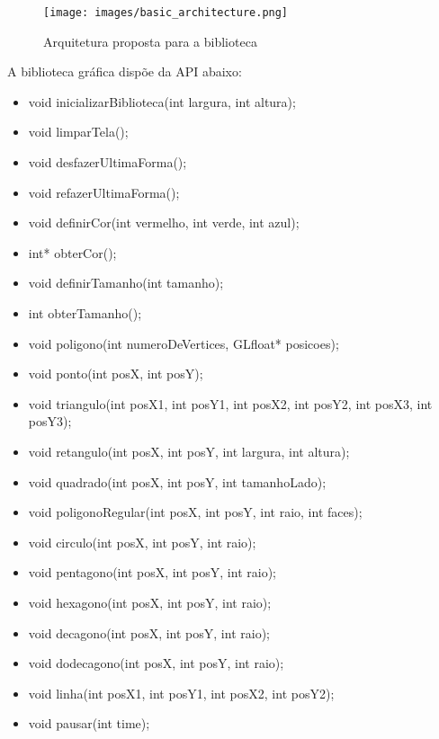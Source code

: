 \documentclass[12pt, %
openright,
oneside, %
a4paper,    %
brazil]{facom-ufu-abntex2}
\begin{document}
\begin{figure}[htbp]
  \centering
  \texttt{[image: images/basic\_architecture.png]}
  \caption{Arquitetura proposta para a biblioteca}
  \label{fig:arquitetura_proposta}
\end{figure}

A biblioteca gráfica dispõe da API abaixo:

\begin{itemize}
    \item void inicializarBiblioteca(int largura, int altura);
    \item void limparTela();
    
    \item void desfazerUltimaForma();
    \item void refazerUltimaForma();
    
    \item void definirCor(int vermelho, int verde, int azul);
    \item int* obterCor();
    
    \item void definirTamanho(int tamanho);
    \item int obterTamanho();

    \item void poligono(int numeroDeVertices, GLfloat* posicoes);
    \item void ponto(int posX, int posY);
    \item void triangulo(int posX1, int posY1, int posX2, int posY2, int posX3, int posY3);
    \item void retangulo(int posX, int posY, int largura, int altura);
    \item void quadrado(int posX, int posY, int tamanhoLado);
    \item void poligonoRegular(int posX, int posY, int raio, int faces);
    \item void circulo(int posX, int posY, int raio);
    \item void pentagono(int posX, int posY, int raio);
    \item void hexagono(int posX, int posY, int raio);
    \item void decagono(int posX, int posY, int raio);
    \item void dodecagono(int posX, int posY, int raio);
    \item void linha(int posX1, int posY1, int posX2, int posY2);
    
    \item void pausar(int time);
\end{itemize}
\end{document}
